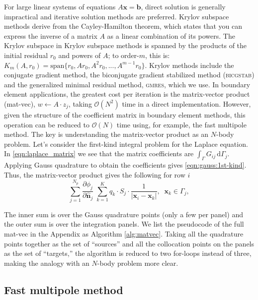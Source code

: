 \documentclass[smallcondensed,final]{svjour3}
\renewcommand{\O}[1]{\mathcal{O}(#1)}
\newcommand{\gmres}{\textsc{gmres}\xspace}
\newcommand{\di}[1]{\text{d}#1}
\newcommand{\partiald}[2]{\frac{\partial #1}{\partial #2}}
\newcommand{\vect}[1]{\mathbf{#1}}
\newcommand{\nhat}{\hat{\mathbf{n}}}
\begin{document}
For large linear systems of equations $A\vect{x}=\vect{b}$, direct solution is generally impractical and iterative solution methods are preferred. Krylov subspace methods derive from the Cayley-Hamilton theorem, which states that you can express the inverse of a  matrix $A$ as a linear combination of its powers. The Krylov subspace in Krylov subspace methods is spanned by the products of the initial residual $r_0$ and powers of $A$; to order-$m$, this is: $K_{m}(A,r_0) = \text{span}\{ r_0, Ar_0, A^{2}r_0, ..., A^{m-1}r_0\}$.
Krylov methods include the conjugate gradient method, the biconjugate gradient stabilized method (\textsc{bicgstab}) and the generalized minimal residual method, \gmres \cite{SaadSchultz1986}, which we use. In boundary element applications, the greatest cost per iteration is the matrix-vector product (mat-vec), $w\gets A\cdot z_j$, taking $\O{N^{2}}$ time in a direct implementation. However, given the structure of the coefficient matrix in boundary element methods, this operation can be reduced to $\O{N}$ time using, for example, the fast multipole method.
The key is understanding the matrix-vector product as an $N$-body problem. Let's consider the first-kind integral problem for the Laplace equation. In \eqref{eqn:laplace_matrix} we see that the matrix coefficients are $\int_{\Gamma} G_{ij}\,\di{\Gamma_j}$. Applying Gauss quadrature to obtain the coefficients gives \eqref{eqn:gauss:1st-kind}. Thus, the matrix-vector product gives the following  for row $i$
%
\begin{equation}\label{eqn:matvec-onerow}
	\sum_{j=1}^{N_p}  \partiald{\phi_j}{\nhat_j}\; \sum_{k=1}^{K} q_k\cdot S_j\cdot \frac{1}{|\vect{x}_i-\vect{x}_k|},\;\;\vect{x}_k \in \Gamma_j, 
\end{equation}

\noindent
The inner sum is over the Gauss quadrature points (only a few per panel) and the outer sum is over the integration panels. We list the pseudocode of the full mat-vec in the Appendix as Algorithm \ref{alg:matvec}. Taking all the quadrature points together as the set of ``sources'' and all the collocation points on the panels as the set of ``targets,'' the algorithm is reduced to two for-loops instead of three, making the analogy with an $N$-body problem more clear.


\subsection{Fast multipole method}
\end{document}
